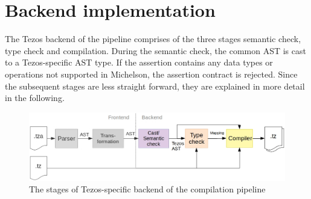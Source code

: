 \section{Backend implementation}\label{sec:backend_impl}
The Tezos backend of the pipeline comprises of the three stages semantic check, type check and compilation. During the semantic check, the common AST is cast to a Tezos-specific AST type. If the assertion contains any data types or operations not supported in Michelson, the assertion contract is rejected. Since the subsequent stages are less straight forward, they are explained in more detail in the following.
\begin{figure}[h]
\includegraphics[width=\linewidth]{figures/5-offline_tezos/pipeline_backend}
\caption{The stages of Tezos-specific backend of the compilation pipeline}
\label{fig:pipeline_backend}
\end{figure}

